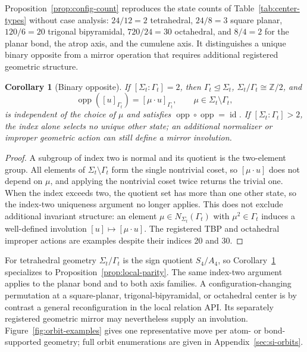 \documentclass[pdflatex,sn-mathphys-num,referee,lineno]{sn-jnl}
\theoremstyle{plain}
\newtheorem{corollary}[theorem]{Corollary}
\theoremstyle{remark}
\theoremstyle{definition}
\begin{document}
Proposition~\ref{prop:config-count} reproduces the state counts of
Table~\ref{tab:center-types} without case analysis:
\(24/12=2\) tetrahedral, \(24/8=3\) square planar, \(120/6=20\) trigonal
bipyramidal, \(720/24=30\) octahedral, and \(8/4=2\) for the planar bond, the
atrop axis, and the cumulene axis. It distinguishes a unique binary opposite
from a mirror operation that requires additional registered geometric structure.

\begin{corollary}[Binary opposite]
\label{cor:binary-opposite}
If \([\Sigma_t:\Gamma_t]=2\), then \(\Gamma_t\trianglelefteq\Sigma_t\),
\(\Sigma_t/\Gamma_t\cong\mathbb Z/2\), and
\[
  \operatorname{opp}([u]_{\Gamma_t})=[\mu\cdot u]_{\Gamma_t},
  \qquad \mu\in\Sigma_t\setminus\Gamma_t ,
\]
is independent of the choice of \(\mu\) and satisfies
\(\operatorname{opp}\circ\operatorname{opp}=\operatorname{id}\).  If
\([\Sigma_t:\Gamma_t]>2\), the index alone selects no unique other state;
an additional normalizer or improper geometric action can still define a
mirror involution.
\end{corollary}

\begin{proof}
A subgroup of index two is normal and its quotient is the two-element group.
All elements of \(\Sigma_t\setminus\Gamma_t\) form the single nontrivial coset,
so \([\mu\cdot u]\) does not depend on \(\mu\), and applying the nontrivial
coset twice returns the trivial one.  When the index exceeds two, the quotient
set has more than one other state, so the index-two uniqueness argument no
longer applies. This does not exclude additional invariant structure: an
element \(\mu\in N_{\Sigma_t}(\Gamma_t)\) with
\(\mu^2\in\Gamma_t\) induces a well-defined involution
\([u]\mapsto[\mu\cdot u]\). The registered TBP and octahedral improper
actions are examples despite their indices 20 and 30.
\end{proof}

For tetrahedral geometry \(\Sigma_t/\Gamma_t\) is the sign quotient
\(S_4/A_4\), so Corollary~\ref{cor:binary-opposite} specializes to
Proposition~\ref{prop:local-parity}.  The same index-two argument applies to the
planar bond and to both axis families.  A configuration-changing permutation at
a square-planar, trigonal-bipyramidal, or octahedral center is by contrast a
general reconfiguration in the local relation API. Its separately registered
geometric mirror may nevertheless supply an involution.  Figure~\ref{fig:orbit-examples} gives
one representative move per atom- or bond-supported geometry; full orbit
enumerations are given in Appendix~\ref{sec:si-orbits}.
\end{document}
